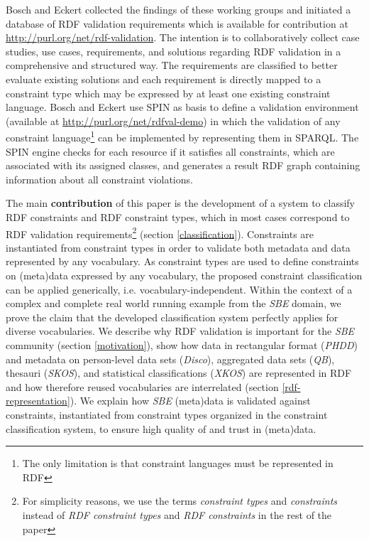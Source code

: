 \documentclass{llncs}
\begin{document}
Bosch and Eckert \cite{BoschEckert2014} collected the findings of these working groups and initiated a database of RDF validation requirements
which is available for contribution at \url{http://purl.org/net/rdf-validation}.
The intention is to collaboratively collect case studies, use cases, requirements, and solutions regarding RDF validation in a comprehensive and structured way. 
The requirements are classified to better evaluate existing solutions and each requirement is directly mapped to a constraint type which may be expressed by at least one existing constraint language.
Bosch and Eckert \cite{BoschEckert2014-2} use SPIN as basis to define a
validation environment (available at \url{http://purl.org/net/rdfval-demo}) in which the validation of any constraint language\footnote{The only limitation is that constraint languages must be represented in RDF} can be implemented by representing them in SPARQL. 
The SPIN engine checks for each resource if it satisfies all constraints, which are associated with its assigned classes, and generates a result RDF graph containing information about all constraint violations.


The main \textbf{contribution} of this paper is the development of a system to classify RDF constraints and RDF constraint types, which in most cases correspond to RDF validation requirements\footnote{For simplicity reasons, we use the terms \emph{constraint types} and \emph{constraints} instead of \emph{RDF constraint types} and \emph{RDF constraints} in the rest of the paper} (section \ref{classification}).
Constraints are instantiated from constraint types in order to validate both metadata and data represented by any vocabulary. 
As constraint types are used to define constraints on (meta)data expressed by any vocabulary, the proposed constraint classification can be applied generically, i.e. vocabulary-independent. 
Within the context of a complex and complete real world running example from the \emph{SBE} domain, we prove the claim that the developed classification system perfectly applies for diverse vocabularies.
We describe why RDF validation is important for the \emph{SBE} community (section \ref{motivation}), 
show how data in rectangular format (\emph{PHDD}) and metadata on person-level data sets (\emph{Disco}), aggregated data sets (\emph{QB}), thesauri (\emph{SKOS}), and statistical classifications (\emph{XKOS}) are represented in RDF and how therefore reused vocabularies are interrelated (section \ref{rdf-representation}).
We explain how \emph{SBE} (meta)data is validated against constraints, instantiated from constraint types organized in the constraint classification system, to ensure high quality of and trust in (meta)data.
\end{document}

